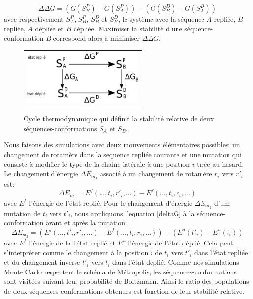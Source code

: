 \begin{equation}
  \label{deltaG}
\Delta \Delta G = (G(S^P_B)- G(S^P_A)) - (G(S^D_B)- G(S^D_A))
\end{equation}  
avec respectivement $S^P_A$, $S^P_B$, $S^D_B$ et $S^D_B$, le système avec la séquence $A$ repliée, $B$ repliée, $A$ dépliée et $B$ dépliée. Maximiser la stabilité d'une séquence-conformation $B$ correspond alors à minimiser $\Delta \Delta G$.

   \begin{figure}[!htbp]
     \centering
     \begin{tabular}{c}
       \includegraphics[width=6cm]{figure/cycleThermo.pdf} \\
     \end{tabular}
     
     \caption{Cycle thermodynamique qui définit la stabilité relative de deux séquences-conformations $S_A$ et $S_B$.}
\label{fig:cycleThermo}
   \end{figure}


Nous faisons des simulations avec deux mouvements élémentaires possibles: un changement de rotamère dans la sequence repliée courante et une mutation qui consiste à modifier le type de la chaîne latérale à une position $i$ tirée au hasard. Le changement d'énergie $\Delta E_{m_1}$ associé à un changement de rotamère $r_i$ vers $r'_i$ est:
\begin{equation}
\Delta E_{m_1}= E^f(...,t_i,r'_i,...) - E^f(...,t_i,r_i,...)     
\end{equation}   
avec $E^f$ l'énergie de l'état replié. Pour le changement d'énergie $\Delta E_{m_2}$ d'une mutation de $t_i$ vers $t'_i$, nous appliquons l'equation \ref{deltaG} à la séquence-conformation avant et après la mutation:    
\begin{equation}
\Delta E_{m_2}= (E^f(...,t'_i,r'_i,...) - E^f(...,t_i,r_i,...)) - (E^u(t'_i) - E^u(t_i))     
\end{equation}   
avec $E^f$ l'énergie de la l'état replié et $E^u$ l'énergie de l'état déplié. Cela peut s'interpréter comme le changement à la position $i$ de $t_i$ vers $t'_i$ dans l'état repliée et du changement inverse $t'_i$ vers $t_i$ dans l'état déplié. Comme nos simulations Monte Carlo respectent le schéma de Métropolis, les séquences-conformations sont visitées suivant leur probabilité de Boltzmann. Ainsi le ratio des populations de deux séquences-conformations obtenues est fonction de leur stabilité relative. 
   

